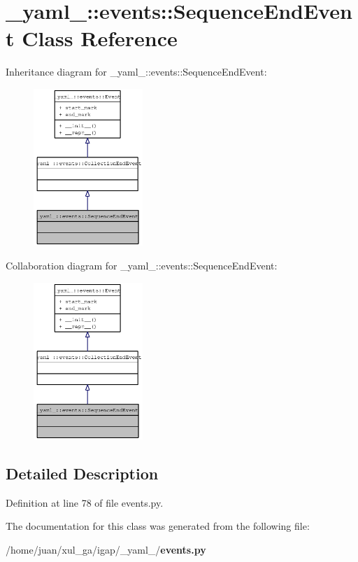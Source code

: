 \section{\_\-yaml\_\-::events::SequenceEndEvent Class Reference}
\label{class__yaml___1_1events_1_1SequenceEndEvent}
Inheritance diagram for \_\-yaml\_\-::events::SequenceEndEvent:\nopagebreak
\begin{figure}[H]
\begin{center}
\leavevmode
\includegraphics[width=117pt]{class__yaml___1_1events_1_1SequenceEndEvent__inherit__graph}
\end{center}
\end{figure}
Collaboration diagram for \_\-yaml\_\-::events::SequenceEndEvent:\nopagebreak
\begin{figure}[H]
\begin{center}
\leavevmode
\includegraphics[width=117pt]{class__yaml___1_1events_1_1SequenceEndEvent__coll__graph}
\end{center}
\end{figure}


\subsection{Detailed Description}


Definition at line 78 of file events.py.

The documentation for this class was generated from the following file:\begin{CompactItemize}
\item 
/home/juan/xul\_\-ga/igap/\_\-yaml\_\-/{\bf events.py}\end{CompactItemize}
